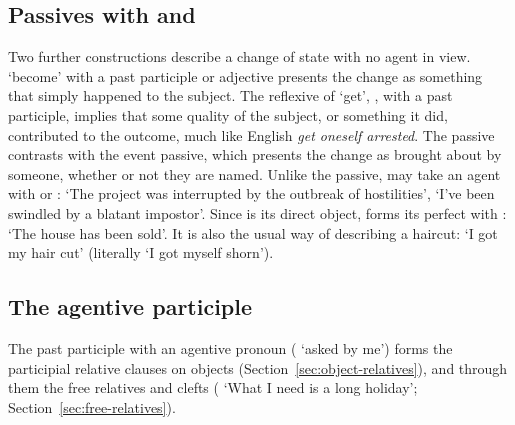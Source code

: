 \subsection{Passives with  and }\label{sec:passive-denir}
Two further constructions describe a change of state with no agent in view.  `become' with a past participle or adjective presents the change as something that simply happened to the subject. The reflexive of  `get', , with a past participle, implies that some quality of the subject, or something it did, contributed to the outcome, much like English \textit{get oneself arrested}.
The  passive contrasts with the event passive, which presents the change as brought about by someone, whether or not they are named.
Unlike the  passive,  may take an agent with  or :  `The project was interrupted by the outbreak of hostilities',  `I've been swindled by a blatant impostor'. Since  is its direct object,  forms its perfect with :  `The house has been sold'. It is also the usual way of describing a haircut:  `I got my hair cut' (literally `I got myself shorn').

\subsection{The agentive participle}
The past participle with an agentive pronoun ( `asked by me') forms the participial relative clauses on objects (Section~\ref{sec:object-relatives}), and through them the free relatives and clefts ( `What I need is a long holiday'; Section~\ref{sec:free-relatives}).

